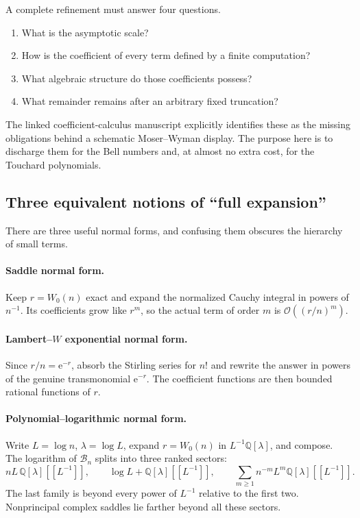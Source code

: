 \documentclass[11pt,a4paper]{article}
\theoremstyle{definition}
\theoremstyle{remark}
\newcommand{\Bell}{\mathcal B}
\newcommand{\Q}{\mathbb Q}
\newcommand{\ee}{\mathrm e}
\newcommand{\BigO}{\mathcal O}
\begin{document}
A complete refinement must answer four questions.
\begin{enumerate}[label=\textup{(\roman*)},leftmargin=2.2em]
\item What is the asymptotic scale?
\item How is the coefficient of every term defined by a finite computation?
\item What algebraic structure do those coefficients possess?
\item What remainder remains after an arbitrary fixed truncation?
\end{enumerate}
The linked coefficient-calculus manuscript explicitly identifies these as the
missing obligations behind a schematic Moser--Wyman display.  The purpose here
is to discharge them for the Bell numbers and, at almost no extra cost, for the
Touchard polynomials.

\subsection{Three equivalent notions of ``full expansion''}

There are three useful normal forms, and confusing them obscures the hierarchy
of small terms.

\paragraph{Saddle normal form.}
Keep \(r=W_0(n)\) exact and expand the normalized Cauchy integral in powers of
\(n^{-1}\).  Its coefficients grow like \(r^m\), so the actual term of order
\(m\) is \(\BigO((r/n)^m)\).

\paragraph{Lambert--\(W\) exponential normal form.}
Since \(r/n=\ee^{-r}\), absorb the Stirling series for \(n!\) and rewrite the
answer in powers of the genuine transmonomial \(\ee^{-r}\).  The coefficient
functions are then bounded rational functions of \(r\).

\paragraph{Polynomial--logarithmic normal form.}
Write \(L=\log n\), \(\lambda=\log L\), expand \(r=W_0(n)\) in
\(L^{-1}\Q[\lambda]\), and compose.  The logarithm of \(\Bell_n\) splits into
three ranked sectors:
\[
 nL\,\Q[\lambda][[L^{-1}]],
 \qquad
 \log L+\Q[\lambda][[L^{-1}]],
 \qquad
 \sum_{m\ge1}n^{-m}L^m\Q[\lambda][[L^{-1}]].
\]
The last family is beyond every power of \(L^{-1}\) relative to the first two.
Nonprincipal complex saddles lie farther beyond all these sectors.
\end{document}
